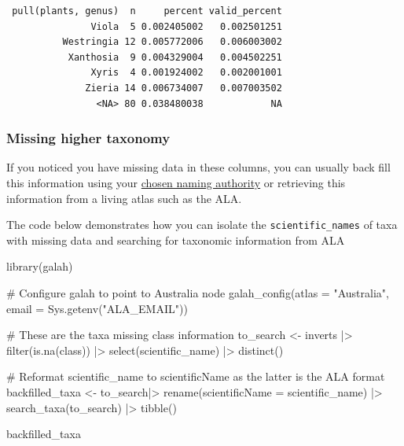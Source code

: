\documentclass[
  letterpaper,
  DIV=11,
  numbers=noendperiod,
  oneside]{scrreprt}
\newenvironment{Shaded}{\begin{snugshade}}{\end{snugshade}}
\newcommand{\AttributeTok}[1]{\textcolor[rgb]{0.40,0.45,0.13}{#1}}
\newcommand{\CommentTok}[1]{\textcolor[rgb]{0.37,0.37,0.37}{#1}}
\newcommand{\FunctionTok}[1]{\textcolor[rgb]{0.28,0.35,0.67}{#1}}
\newcommand{\NormalTok}[1]{\textcolor[rgb]{0.00,0.23,0.31}{#1}}
\newcommand{\OtherTok}[1]{\textcolor[rgb]{0.00,0.23,0.31}{#1}}
\newcommand{\SpecialCharTok}[1]{\textcolor[rgb]{0.37,0.37,0.37}{#1}}
\newcommand{\StringTok}[1]{\textcolor[rgb]{0.13,0.47,0.30}{#1}}
\begin{document}
\begin{verbatim}
 pull(plants, genus)  n     percent valid_percent
               Viola  5 0.002405002   0.002501251
          Westringia 12 0.005772006   0.006003002
           Xanthosia  9 0.004329004   0.004502251
               Xyris  4 0.001924002   0.002001001
              Zieria 14 0.006734007   0.007003502
                <NA> 80 0.038480038            NA
\end{verbatim}

\hypertarget{missing-higher-taxonomy}{%
\subsubsection*{Missing higher taxonomy}\label{missing-higher-taxonomy}}

If you noticed you have missing data in these columns, you can usually
back fill this information using your
\href{link\%20back\%20to\%20section}{chosen naming authority} or
retrieving this information from a living atlas such as the ALA.

The code below demonstrates how you can isolate the
\texttt{scientific\_names} of taxa with missing data and searching for
taxonomic information from ALA

\begin{Shaded}
\begin{Highlighting}[]
\FunctionTok{library}\NormalTok{(galah)}

\CommentTok{\# Configure galah to point to Australia node}
\FunctionTok{galah\_config}\NormalTok{(}\AttributeTok{atlas =} \StringTok{"Australia"}\NormalTok{,}
             \AttributeTok{email =} \FunctionTok{Sys.getenv}\NormalTok{(}\StringTok{"ALA\_EMAIL"}\NormalTok{))}

\CommentTok{\# These are the taxa missing \textasciigrave{}class\textasciigrave{} information}
\NormalTok{to\_search }\OtherTok{\textless{}{-}}\NormalTok{ inverts }\SpecialCharTok{|\textgreater{}} 
  \FunctionTok{filter}\NormalTok{(}\FunctionTok{is.na}\NormalTok{(class)) }\SpecialCharTok{|\textgreater{}} 
  \FunctionTok{select}\NormalTok{(scientific\_name) }\SpecialCharTok{|\textgreater{}} 
  \FunctionTok{distinct}\NormalTok{()}

\CommentTok{\# Reformat scientific\_name to scientificName as the latter is the ALA format}
\NormalTok{backfilled\_taxa }\OtherTok{\textless{}{-}}\NormalTok{ to\_search}\SpecialCharTok{|\textgreater{}}
  \FunctionTok{rename}\NormalTok{(}\AttributeTok{scientificName =}\NormalTok{ scientific\_name) }\SpecialCharTok{|\textgreater{}} 
  \FunctionTok{search\_taxa}\NormalTok{(to\_search) }\SpecialCharTok{|\textgreater{}} \FunctionTok{tibble}\NormalTok{()}

\NormalTok{backfilled\_taxa}
\end{Highlighting}
\end{Shaded}
\end{document}
